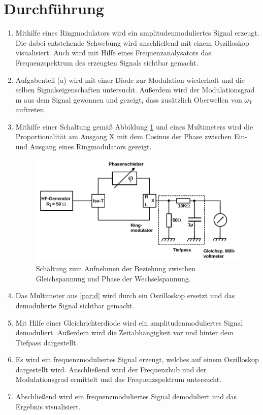 \section{Durchf\"{u}hrung}
\begin{enumerate}
\item
\label{par:a}
Mithilfe eines Ringmodulators wird ein amplitudenmoduliertes Signal erzeugt. Die dabei entstehende Schwebung wird anschließend mit einem
Oszilloskop visualisiert. Auch wird mit Hilfe eines Frequenzanalysators das Frequenzspektrum des erzeugten Signals sichtbar gemacht.

\item
\label{par:b}
Aufgabenteil (a) wird mit einer Diode zur Modulation wiederholt und die selben Signalseigenschaften untersucht.
Außerdem wird der Modulationsgrad m aus dem Signal gewonnen und gezeigt, dass zusätzlich Oberwellen von $\omega_\text{T}$ auftreten.

\item
\label{par:c}
Mithilfe einer Schaltung gemäß Abbildung \ref{Abb14} und eines Multimeters wird die Proportionalität am Ausgang X mit dem Cosinus der Phase zwischen 
Ein- und Ausgang eines Ringmodulators gezeigt.

\begin{figure}
	\centering
	\includegraphics[width=\textwidth]{img/Abb14.pdf}
	\caption{Schaltung zum Aufnehmen der Beziehung zwischen Gleichspannung und Phase der Wechselspannung. \cite{FP}}
	\label{Abb14}
\end{figure}

\item
\label{par:d}
Das Multimeter aus \ref{par:d} wird durch ein Oszilloskop ersetzt und das demodulierte Signal sichtbar gemacht.

\item
\label{par:e}
Mit Hilfe einer Gleichrichterdiode wird ein amplitudenmoduliertes Signal demoduliert.
Außerdem wird die Zeitabhängigkeit vor und hinter dem Tiefpass dargestellt.

\item
\label{par:f}
Es wird ein frequenzmoduliertes Signal erzeugt, welches auf einem Oszilloskop dargestellt wird. Anschließend wird der Frequenzhub und
der Modulationsgrad ermittelt und das Frequenzspektrum untersucht.

\item
\label{par:g}
Abschließend wird ein frequenzmoduliertes Signal demoduliert und das Ergebnis visualisiert.
\end{enumerate}
